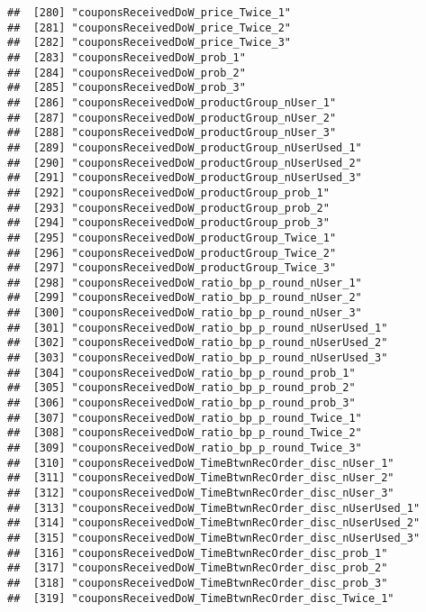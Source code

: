 \documentclass[10pt]{report}
\begin{document}
\begin{verbatim}
##  [280] "couponsReceivedDoW_price_Twice_1"                     
##  [281] "couponsReceivedDoW_price_Twice_2"                     
##  [282] "couponsReceivedDoW_price_Twice_3"                     
##  [283] "couponsReceivedDoW_prob_1"                            
##  [284] "couponsReceivedDoW_prob_2"                            
##  [285] "couponsReceivedDoW_prob_3"                            
##  [286] "couponsReceivedDoW_productGroup_nUser_1"              
##  [287] "couponsReceivedDoW_productGroup_nUser_2"              
##  [288] "couponsReceivedDoW_productGroup_nUser_3"              
##  [289] "couponsReceivedDoW_productGroup_nUserUsed_1"          
##  [290] "couponsReceivedDoW_productGroup_nUserUsed_2"          
##  [291] "couponsReceivedDoW_productGroup_nUserUsed_3"          
##  [292] "couponsReceivedDoW_productGroup_prob_1"               
##  [293] "couponsReceivedDoW_productGroup_prob_2"               
##  [294] "couponsReceivedDoW_productGroup_prob_3"               
##  [295] "couponsReceivedDoW_productGroup_Twice_1"              
##  [296] "couponsReceivedDoW_productGroup_Twice_2"              
##  [297] "couponsReceivedDoW_productGroup_Twice_3"              
##  [298] "couponsReceivedDoW_ratio_bp_p_round_nUser_1"          
##  [299] "couponsReceivedDoW_ratio_bp_p_round_nUser_2"          
##  [300] "couponsReceivedDoW_ratio_bp_p_round_nUser_3"          
##  [301] "couponsReceivedDoW_ratio_bp_p_round_nUserUsed_1"      
##  [302] "couponsReceivedDoW_ratio_bp_p_round_nUserUsed_2"      
##  [303] "couponsReceivedDoW_ratio_bp_p_round_nUserUsed_3"      
##  [304] "couponsReceivedDoW_ratio_bp_p_round_prob_1"           
##  [305] "couponsReceivedDoW_ratio_bp_p_round_prob_2"           
##  [306] "couponsReceivedDoW_ratio_bp_p_round_prob_3"           
##  [307] "couponsReceivedDoW_ratio_bp_p_round_Twice_1"          
##  [308] "couponsReceivedDoW_ratio_bp_p_round_Twice_2"          
##  [309] "couponsReceivedDoW_ratio_bp_p_round_Twice_3"          
##  [310] "couponsReceivedDoW_TimeBtwnRecOrder_disc_nUser_1"     
##  [311] "couponsReceivedDoW_TimeBtwnRecOrder_disc_nUser_2"     
##  [312] "couponsReceivedDoW_TimeBtwnRecOrder_disc_nUser_3"     
##  [313] "couponsReceivedDoW_TimeBtwnRecOrder_disc_nUserUsed_1" 
##  [314] "couponsReceivedDoW_TimeBtwnRecOrder_disc_nUserUsed_2" 
##  [315] "couponsReceivedDoW_TimeBtwnRecOrder_disc_nUserUsed_3" 
##  [316] "couponsReceivedDoW_TimeBtwnRecOrder_disc_prob_1"      
##  [317] "couponsReceivedDoW_TimeBtwnRecOrder_disc_prob_2"      
##  [318] "couponsReceivedDoW_TimeBtwnRecOrder_disc_prob_3"      
##  [319] "couponsReceivedDoW_TimeBtwnRecOrder_disc_Twice_1"     

\end{verbatim}
\end{document}
